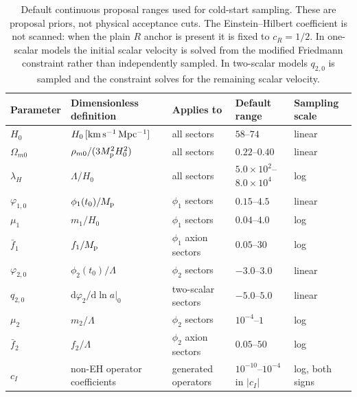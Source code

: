 \documentclass[aps,prd,twocolumn,superscriptaddress,nofootinbib,longbibliography]{revtex4-2}
\newcommand{\dd}{\mathrm{d}}
\newcommand{\Mp}{M_{\rm p}}
\newcommand{\Lam}{\Lambda}
\begin{document}
\begin{table}[t]
\centering
\begin{ruledtabular}
\begin{tabular}{lllll}
Parameter & Dimensionless definition & Applies to & Default range & Sampling scale \\
\hline
$H_0$ & $H_0\,[{\rm km\,s^{-1}\,Mpc^{-1}}]$ & all sectors & $58$--$74$ & linear \\
$\Omega_{m0}$ & $\rho_{m0}/(3\Mp^2H_0^2)$ & all sectors & $0.22$--$0.40$ & linear \\
$\lambda_H$ & $\Lam/H_0$ & all sectors & $5.0\times10^2$--$8.0\times10^4$ & log \\
$\varphi_{1,0}$ & $\phi_1(t_0)/\Mp$ & $\phi_1$ sectors & $0.15$--$4.5$ & linear \\
$\mu_1$ & $m_1/H_0$ & $\phi_1$ sectors & $0.04$--$4.0$ & log \\
$\bar f_1$ & $f_1/\Mp$ & $\phi_1$ axion sectors & $0.05$--$30$ & log \\
$\varphi_{2,0}$ & $\phi_2(t_0)/\Lam$ & $\phi_2$ sectors & $-3.0$--$3.0$ & linear \\
$q_{2,0}$ & $\dd\varphi_2/\dd\ln a|_{0}$ & two-scalar sectors & $-5.0$--$5.0$ & linear \\
$\mu_2$ & $m_2/\Lam$ & $\phi_2$ sectors & $10^{-4}$--$1$ & log \\
$\bar f_2$ & $f_2/\Lam$ & $\phi_2$ axion sectors & $0.05$--$50$ & log \\
$c_I$ & non-EH operator coefficients & generated operators & $10^{-10}$--$10^{-4}$ in $|c_I|$ & log, both signs \\
\end{tabular}
\end{ruledtabular}
\caption{Default continuous proposal ranges used for cold-start sampling.  These are proposal priors, not physical acceptance cuts.  The Einstein--Hilbert coefficient is not scanned: when the plain $R$ anchor is present it is fixed to $c_R=1/2$.  In one-scalar models the initial scalar velocity is solved from the modified Friedmann constraint rather than independently sampled.  In two-scalar models $q_{2,0}$ is sampled and the constraint solves for the remaining scalar velocity.}
\label{tab:parameter-priors}
\end{table}
\end{document}
